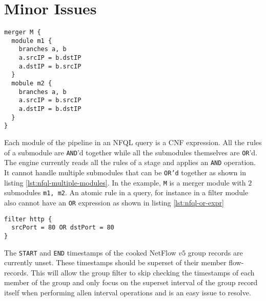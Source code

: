 \section{Minor Issues}\label{sec:minor-issues}

\begin{lstlisting}
merger M {
  module m1 {
    branches a, b
    a.srcIP = b.dstIP
    a.dstIP = b.srcIP
  }
  mobule m2 {
    branches a, b
    a.srcIP = b.srcIP
    a.dstIP = b.dstIP
  }
}
\end{lstlisting}

Each module of the pipeline in an \ac{NFQL} query is a \ac{CNF} expression.
All the rules of a submodule are \texttt{AND}'d together while all the
submodules themselves are \texttt{OR}'d. The engine currently reads all the
rules of a stage and applies an \texttt{AND}  operation. It cannot handle multiple submodules that can be
\texttt{OR'd} together as shown in listing \ref{lst:nfql-multiple-modules}. In
the example, \texttt{M} is a merger module with $2$ submodules \texttt{m1,
m2}. An atomic rule in a query, for instance in a filter module also cannot
have an \texttt{OR} expression as shown in listing \ref{lst:nfql-or-expr}

\begin{lstlisting}
filter http {
  srcPort = 80 OR dstPort = 80
}
\end{lstlisting}

The \texttt{START} and \texttt{END} timestamps of the cooked NetFlow $v5$
group records are currently unset. These timestamps should be superset of
their member  flow-records.
This will allow the group filter to skip checking the timestamps of each
member of the group and only focus on the superset interval of the group
record itself when performing allen interval operations and is an easy issue
to resolve.

